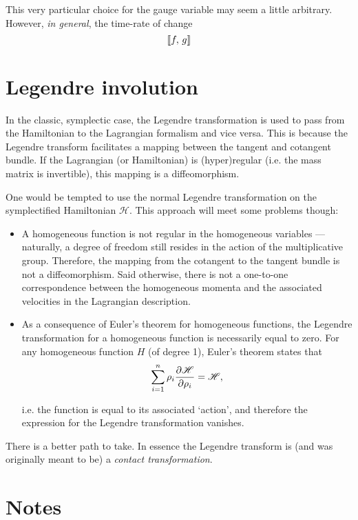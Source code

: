 This very particular choice for the gauge variable may seem a little arbitrary. However, \emph{in general}, the time-rate of change
$$
    \left\llbracket f,\,g\right\rrbracket
$$



\section{Legendre involution}
In the classic, symplectic case, the Legendre transformation is used to pass from the Hamiltonian to the Lagrangian formalism and vice versa. This is because the Legendre transform facilitates a mapping between the tangent and cotangent bundle. If the Lagrangian (or Hamiltonian) is (hyper)regular (i.e. the mass matrix is invertible), this mapping is a diffeomorphism. \cite{Carinena1990}

One would be tempted to use the normal Legendre transformation on the symplectified Hamiltonian $\mathscr{H}$. This approach will meet some problems though:
\begin{itemize}
    \item A homogeneous function is not regular in the homogeneous variables --- naturally, a degree of freedom still resides in the action of the multiplicative group. Therefore, the mapping from the cotangent to the tangent bundle is not a diffeomorphism. Said otherwise, there is not a one-to-one correspondence between the homogeneous momenta and the associated velocities in the Lagrangian description.
    \item As a consequence of Euler's theorem for homogeneous functions, the Legendre transformation for a homogeneous function is necessarily equal to zero. For any homogeneous function $H$ (of degree 1), Euler's theorem states that
    $$ \sum_{i = 1}^n \rho_i \pdv{\mathscr{H}}{\rho_i} = \mathscr{H}, $$

        i.e. the function is equal to its associated `action', and therefore the expression for the Legendre transformation vanishes. \cite{Dirac1950,Dirac1933}
\end{itemize}
There is a better path to take. In essence the Legendre transform is (and was originally meant to be) a \emph{contact transformation}.

\section{Notes}


